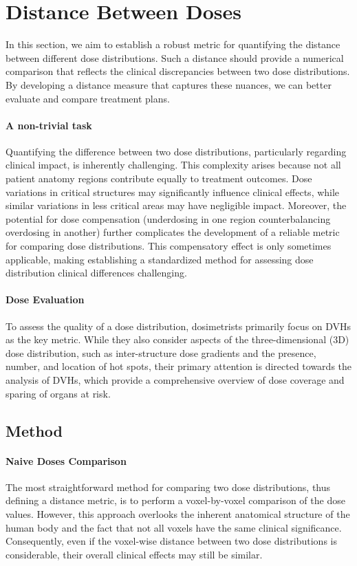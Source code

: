 \section{Distance Between Doses}
In this section, we aim to establish a robust metric for quantifying the distance between different dose distributions.
Such a distance should provide a numerical comparison that reflects the clinical discrepancies between two dose distributions.
By developing a distance measure that captures these nuances, we can better evaluate and compare treatment plans.

\paragraph{A non-trivial task}
Quantifying the difference between two dose distributions, particularly regarding clinical impact, is inherently challenging.
This complexity arises because not all patient anatomy regions contribute equally to treatment outcomes.
Dose variations in critical structures may significantly influence clinical effects, while similar variations in less critical areas may have negligible impact.
Moreover, the potential for dose compensation (underdosing in one region counterbalancing overdosing in another) further complicates the development of a reliable metric for comparing dose distributions.
This compensatory effect is only sometimes applicable, making establishing a standardized method for assessing dose distribution clinical differences challenging.

\paragraph{Dose Evaluation}
To assess the quality of a dose distribution, dosimetrists primarily focus on DVHs as the key metric.
While they also consider aspects of the three-dimensional (3D) dose distribution, such as inter-structure dose gradients and the presence, number, and location of hot spots, their primary attention is directed towards the analysis of DVHs, which provide a comprehensive overview of dose coverage and sparing of organs at risk.

\subsection{Method}

\paragraph{Naive Doses Comparison}
The most straightforward method for comparing two dose distributions, thus defining a distance metric, is to perform a voxel-by-voxel comparison of the dose values.
However, this approach overlooks the inherent anatomical structure of the human body and the fact that not all voxels have the same clinical significance.
Consequently, even if the voxel-wise distance between two dose distributions is considerable, their overall clinical effects may still be similar.

